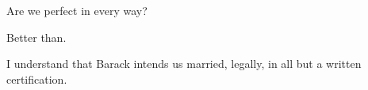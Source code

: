  

Are we perfect in every way?

Better than.  

I understand that Barack intends us married, \break legally, in all
but a written certification.


\bye
